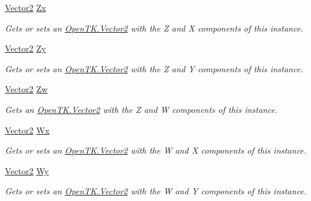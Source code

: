 \begin{DoxyCompactItemize}
\hyperlink{struct_open_t_k_1_1_vector2}{Vector2} \hyperlink{struct_open_t_k_1_1_vector4_a3262828fe7ba03156975e222a689fbe0}{Zx}
\begin{DoxyCompactList}\small\item\em Gets or sets an \hyperlink{struct_open_t_k_1_1_vector2}{Open\-T\-K.\-Vector2} with the Z and X components of this instance. \end{DoxyCompactList}\item 
\hyperlink{struct_open_t_k_1_1_vector2}{Vector2} \hyperlink{struct_open_t_k_1_1_vector4_a6b251d1aabb60d339aca57817dfcf45e}{Zy}
\begin{DoxyCompactList}\small\item\em Gets or sets an \hyperlink{struct_open_t_k_1_1_vector2}{Open\-T\-K.\-Vector2} with the Z and Y components of this instance. \end{DoxyCompactList}\item 
\hyperlink{struct_open_t_k_1_1_vector2}{Vector2} \hyperlink{struct_open_t_k_1_1_vector4_ab22b4c879a39da1588e14ff867627b44}{Zw}
\begin{DoxyCompactList}\small\item\em Gets an \hyperlink{struct_open_t_k_1_1_vector2}{Open\-T\-K.\-Vector2} with the Z and W components of this instance. \end{DoxyCompactList}\item 
\hyperlink{struct_open_t_k_1_1_vector2}{Vector2} \hyperlink{struct_open_t_k_1_1_vector4_a755c295f62f2d11e38e2c0b451b2da19}{Wx}
\begin{DoxyCompactList}\small\item\em Gets or sets an \hyperlink{struct_open_t_k_1_1_vector2}{Open\-T\-K.\-Vector2} with the W and X components of this instance. \end{DoxyCompactList}\item 
\hyperlink{struct_open_t_k_1_1_vector2}{Vector2} \hyperlink{struct_open_t_k_1_1_vector4_ab3cccbcf54325d45c265fcc142fa5be0}{Wy}
\begin{DoxyCompactList}\small\item\em Gets or sets an \hyperlink{struct_open_t_k_1_1_vector2}{Open\-T\-K.\-Vector2} with the W and Y components of this instance. \end{DoxyCompactList}\item 

\end{DoxyCompactItemize}

